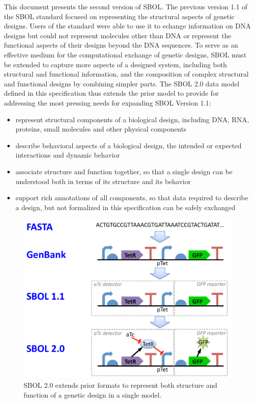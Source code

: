 This document presents the second version of SBOL.
The previous version 1.1 of the SBOL standard focused on representing the structural aspects of genetic designs. 
Users of the standard were able to use it to echange information on DNA designs but could not represent molecules other than DNA or represent the functional aspects of their designs beyond the DNA sequences. 
To serve as an effective medium for the computational exchange of genetic designs, SBOL must be extended to capture more aspects of a designed system, including both structural and functional information, and the composition of complex structural and functional designs by combining simpler parts. 
The SBOL 2.0 data model defined in this specification thus extends the prior model to provide for addressing the most pressing needs for expanding SBOL Version 1.1:

\begin{itemize}

\item represent structural components of a biological design, including DNA, RNA, proteins, small molecules and other physical components

\item describe behavioral aspects of a biological design, the intended or expected interactions and dynamic behavior

\item associate structure and function together, so that a single design can be understood both in terms of its structure and its behavior

\item support rich annotations of all components, so that data required to describe a design, but not formalized in this specification can be safely exchanged

\end{itemize}

\begin{figure}
\centering
\includegraphics[width=5in]{images/format-comparison.pdf}
\caption{SBOL 2.0 extends prior formats to represent both structure and function of a genetic design in a single model.}
\end{figure}

